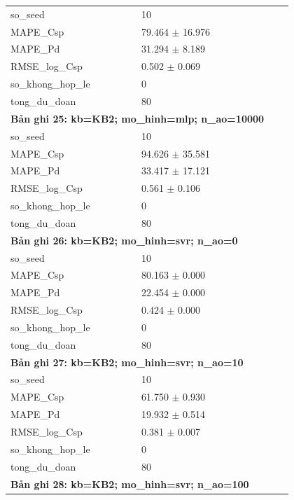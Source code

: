 \begin{longtable}{p{0.43\linewidth}p{0.50\linewidth}}
so\_\allowbreak seed & 10 \\
MAPE\_\allowbreak Csp & 79.464 $\pm$ 16.976 \\
MAPE\_\allowbreak Pd & 31.294 $\pm$ 8.189 \\
RMSE\_\allowbreak log\_\allowbreak Csp & 0.502 $\pm$ 0.069 \\
so\_\allowbreak khong\_\allowbreak hop\_\allowbreak le & 0 \\
tong\_\allowbreak du\_\allowbreak doan & 80 \\
\midrule
\multicolumn{2}{p{0.95\linewidth}}{\textbf{Bản ghi 25: kb=KB2; mo\_hinh=mlp; n\_ao=10000}} \\
so\_\allowbreak seed & 10 \\
MAPE\_\allowbreak Csp & 94.626 $\pm$ 35.581 \\
MAPE\_\allowbreak Pd & 33.417 $\pm$ 17.121 \\
RMSE\_\allowbreak log\_\allowbreak Csp & 0.561 $\pm$ 0.106 \\
so\_\allowbreak khong\_\allowbreak hop\_\allowbreak le & 0 \\
tong\_\allowbreak du\_\allowbreak doan & 80 \\
\midrule
\multicolumn{2}{p{0.95\linewidth}}{\textbf{Bản ghi 26: kb=KB2; mo\_hinh=svr; n\_ao=0}} \\
so\_\allowbreak seed & 10 \\
MAPE\_\allowbreak Csp & 80.163 $\pm$ 0.000 \\
MAPE\_\allowbreak Pd & 22.454 $\pm$ 0.000 \\
RMSE\_\allowbreak log\_\allowbreak Csp & 0.424 $\pm$ 0.000 \\
so\_\allowbreak khong\_\allowbreak hop\_\allowbreak le & 0 \\
tong\_\allowbreak du\_\allowbreak doan & 80 \\
\midrule
\multicolumn{2}{p{0.95\linewidth}}{\textbf{Bản ghi 27: kb=KB2; mo\_hinh=svr; n\_ao=10}} \\
so\_\allowbreak seed & 10 \\
MAPE\_\allowbreak Csp & 61.750 $\pm$ 0.930 \\
MAPE\_\allowbreak Pd & 19.932 $\pm$ 0.514 \\
RMSE\_\allowbreak log\_\allowbreak Csp & 0.381 $\pm$ 0.007 \\
so\_\allowbreak khong\_\allowbreak hop\_\allowbreak le & 0 \\
tong\_\allowbreak du\_\allowbreak doan & 80 \\
\midrule
\multicolumn{2}{p{0.95\linewidth}}{\textbf{Bản ghi 28: kb=KB2; mo\_hinh=svr; n\_ao=100}} \\

\end{longtable}
